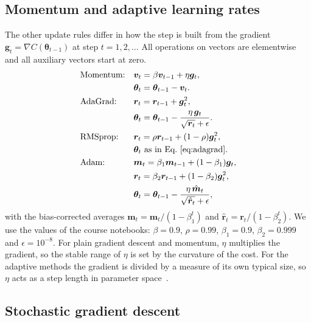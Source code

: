 \documentclass[aps,reprint,amsmath,amssymb,nofootinbib,floatfix]{revtex4-2}
\begin{document}
\subsection{Momentum and adaptive learning rates}\label{sec:optimisers}

The other update rules differ in how the step is built from the gradient
$\bm g_t=\nabla C(\bm\theta_{t-1})$ at step $t=1,2,\dots$ All operations on vectors are elementwise
and all auxiliary vectors start at zero.
{\allowdisplaybreaks
\begin{align}
  &\text{Momentum:}&&\bm v_t=\beta\bm v_{t-1}+\eta\bm g_t,\nonumber\\*
  &&&\bm\theta_t=\bm\theta_{t-1}-\bm v_t. \label{eq:momentum}\\
  &\text{AdaGrad:}&&\bm r_t=\bm r_{t-1}+\bm g_t^2,\nonumber\\*
  &&&\bm\theta_t=\bm\theta_{t-1}-\frac{\eta\,\bm g_t}{\sqrt{\bm r_t}+\epsilon}. \label{eq:adagrad}\\
  &\text{RMSprop:}&&\bm r_t=\rho\bm r_{t-1}+(1-\rho)\bm g_t^2,\nonumber\\*
  &&&\bm\theta_t\ \text{as in Eq.~\eqref{eq:adagrad}}. \label{eq:rmsprop}\\
  &\text{Adam:}&&\bm m_t=\beta_1\bm m_{t-1}+(1-\beta_1)\bm g_t,\nonumber\\*
  &&&\bm r_t=\beta_2\bm r_{t-1}+(1-\beta_2)\bm g_t^2,\nonumber\\*
  &&&\bm\theta_t=\bm\theta_{t-1}-\frac{\eta\,\hat{\bm m}_t}{\sqrt{\hat{\bm r}_t}+\epsilon}, \label{eq:adam}
\end{align}}
with the bias-corrected averages $\hat{\bm m}_t=\bm m_t/(1-\beta_1^t)$ and
$\hat{\bm r}_t=\bm r_t/(1-\beta_2^t)$. We use the values of the course notebooks: $\beta=0.9$,
$\rho=0.99$, $\beta_1=0.9$, $\beta_2=0.999$ and $\epsilon=10^{-8}$. For plain gradient descent and
momentum, $\eta$ multiplies the gradient, so the stable range of $\eta$ is set by the curvature of
the cost. For the adaptive methods the gradient is divided by a measure of its own typical size,
so $\eta$ acts as a step length in parameter space~\cite{hjorthjensen2026}.

\subsection{Stochastic gradient descent}\label{sec:sgd}
\end{document}

